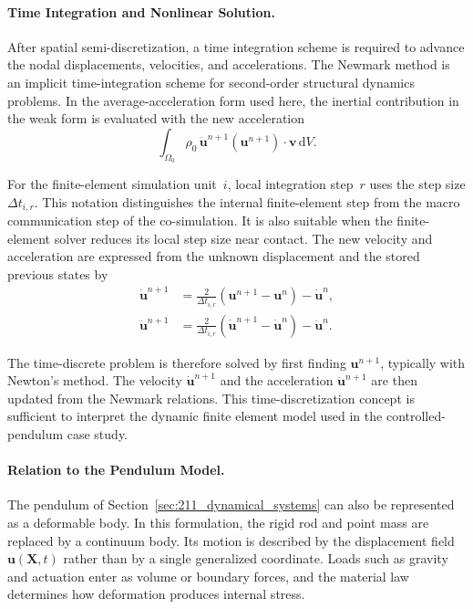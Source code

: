 \paragraph{Time Integration and Nonlinear Solution.}
After spatial semi-discretization, a time integration scheme is required to advance the nodal displacements, velocities, and accelerations.
The Newmark method is an implicit time-integration scheme for second-order structural dynamics problems.
In the average-acceleration form used here, the inertial contribution in the weak form is evaluated with the new acceleration~\cite{newmark_method_1959,kochmann_introduction_2025}
\begin{equation}
    \int_{\Omega_0}
    \rho_0\,
    \ddot{\mathbf{u}}^{n+1}(\mathbf{u}^{n+1})
    \cdot
    \mathbf{v}\,
    \mathrm{d}V .
    \label{eq:fem_newmark_inertia}
\end{equation}

For the finite-element simulation unit~$i$, local integration step~$r$ uses the step size $\Delta t_{i,r}$.
This notation distinguishes the internal finite-element step from the macro communication step of the co-simulation.
It is also suitable when the finite-element solver reduces its local step size near contact.
The new velocity and acceleration are expressed from the unknown displacement and the stored previous states by
\begin{align}
    \dot{\mathbf{u}}^{n+1}
    &=
    \frac{2}{\Delta t_{i,r}}
    \left(
        \mathbf{u}^{n+1}
        -
        \mathbf{u}^{n}
    \right)
    -
    \dot{\mathbf{u}}^{n},
    \label{eq:fem_newmark_velocity}
    \\
    \ddot{\mathbf{u}}^{n+1}
    &=
    \frac{2}{\Delta t_{i,r}}
    \left(
        \dot{\mathbf{u}}^{n+1}
        -
        \dot{\mathbf{u}}^{n}
    \right)
    -
    \ddot{\mathbf{u}}^{n}.
    \label{eq:fem_newmark_acceleration}
\end{align}

The time-discrete problem is therefore solved by first finding $\mathbf{u}^{n+1}$, typically with Newton's method.
The velocity $\dot{\mathbf{u}}^{n+1}$ and the acceleration $\ddot{\mathbf{u}}^{n+1}$ are then updated from the Newmark relations.
This time-discretization concept is sufficient to interpret the dynamic finite element model used in the controlled-pendulum case study.

\paragraph{Relation to the Pendulum Model.}
The pendulum of Section~\ref{sec:211_dynamical_systems} can also be represented as a deformable body.
In this formulation, the rigid rod and point mass are replaced by a continuum body.
Its motion is described by the displacement field $\mathbf{u}(\mathbf{X},t)$ rather than by a single generalized coordinate.
Loads such as gravity and actuation enter as volume or boundary forces, and the material law determines how deformation produces internal stress.

